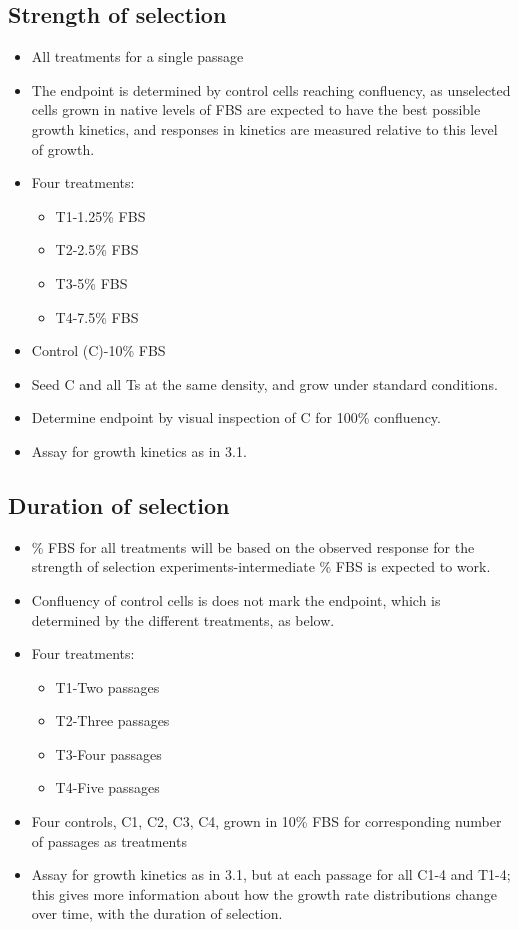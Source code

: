 \documentclass[12pt, letterpaper, onecolumn]{article}
\begin{document}
	\subsection{Strength of selection}
	\begin{itemize}
		\item All treatments for a single passage
		\item The endpoint is determined by control cells reaching confluency, as unselected cells grown in native levels of FBS are expected to have the best possible growth kinetics, and responses in kinetics are measured relative to this level of growth.
		\item Four treatments:
		\begin{itemize}
			\item T1-1.25\% FBS
			\item T2-2.5\% FBS
			\item T3-5\% FBS
			\item T4-7.5\% FBS
		\end{itemize}
		\item Control (C)-10\% FBS
		\item Seed C and all Ts at the same density, and grow under standard conditions.
		\item Determine endpoint by visual inspection of C for 100\% confluency.
		\item Assay for growth kinetics as in 3.1.
	\end{itemize}

	\subsection{Duration of selection}
	\begin{itemize}
		\item \% FBS for all treatments will be based on the observed response for the strength of selection experiments-intermediate \% FBS is expected to work.
		\item Confluency of control cells is does not mark the endpoint, which is determined by the different treatments, as below.
		\item Four treatments:
		\begin{itemize}
			\item T1-Two passages
			\item T2-Three passages
			\item T3-Four passages
			\item T4-Five passages
		\end{itemize}
		\item Four controls, C1, C2, C3, C4, grown in 10\% FBS for corresponding number of passages as treatments
		\item Assay for growth kinetics as in 3.1, but at each passage for all C1-4 and T1-4; this gives more information about how the growth rate distributions change over time, with the duration of selection.
	\end{itemize}
\end{document}
